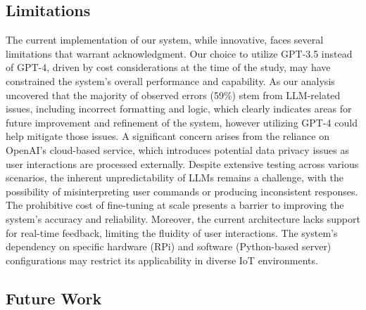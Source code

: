 \documentclass{ieeeaccess}
\begin{document}
\subsection{Limitations}
The current implementation of our system, while innovative, faces several limitations that warrant acknowledgment. Our choice to utilize GPT-3.5 instead of GPT-4, driven by cost considerations at the time of the study, may have constrained the system's overall performance and capability. As our analysis uncovered that the majority of observed errors (59\%) stem from LLM-related issues, including incorrect formatting and logic, which clearly indicates areas for future improvement and refinement of the system, however utilizing GPT-4 could help mitigate those issues. A significant concern arises from the reliance on OpenAI's cloud-based service, which introduces potential data privacy issues as user interactions are processed externally. Despite extensive testing across various scenarios, the inherent unpredictability of LLMs remains a challenge, with the possibility of misinterpreting user commands or producing inconsistent responses. The prohibitive cost of fine-tuning at scale presents a barrier to improving the system's accuracy and reliability. Moreover, the current architecture lacks support for real-time feedback, limiting the fluidity of user interactions. The system's dependency on specific hardware (RPi) and software (Python-based server) configurations may restrict its applicability in diverse IoT environments.
\subsection{Future Work}
\end{document}
